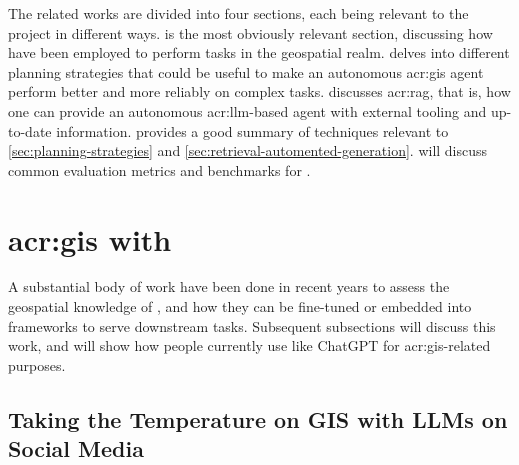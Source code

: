 The related works are divided into four sections, each being relevant to the project in different ways.  is the most obviously relevant section, discussing how  have been employed to perform tasks in the geospatial realm.  delves into different planning strategies that could be useful to make an autonomous \acrshort{acr:gis} agent perform better and more reliably on complex tasks.  discusses \gls{acr:rag}, that is, how one can provide an autonomous \acrshort{acr:llm}-based agent with external tooling and up-to-date information. \cite{wengLLMPoweredAutonomous2023} provides a good summary of techniques relevant to \autoref{sec:planning-strategies} and \autoref{sec:retrieval-automented-generation}.  will discuss common evaluation metrics and benchmarks for .



\section[GIS with LLMs]{\acrshort{acr:gis} with }\label{sec:gis-with-llms}

A substantial body of work have been done in recent years to assess the geospatial knowledge of , and how they can be fine-tuned or embedded into frameworks to serve downstream tasks. Subsequent subsections will discuss this work, and  will show how people currently use  like ChatGPT for \acrshort{acr:gis}-related purposes.

\subsection{Taking the Temperature on GIS with LLMs on Social Media}\label{subsec:social-media}

